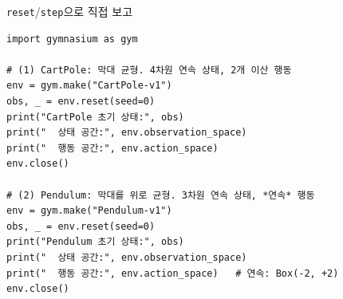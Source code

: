 \begin{frame}[fragile]{\texttt{reset}/\texttt{step}으로 직접 보고}
\begin{lstlisting}
import gymnasium as gym

# (1) CartPole: 막대 균형. 4차원 연속 상태, 2개 이산 행동
env = gym.make("CartPole-v1")
obs, _ = env.reset(seed=0)
print("CartPole 초기 상태:", obs)
print("  상태 공간:", env.observation_space)
print("  행동 공간:", env.action_space)
env.close()

# (2) Pendulum: 막대를 위로 균형. 3차원 연속 상태, *연속* 행동
env = gym.make("Pendulum-v1")
obs, _ = env.reset(seed=0)
print("Pendulum 초기 상태:", obs)
print("  상태 공간:", env.observation_space)
print("  행동 공간:", env.action_space)   # 연속: Box(-2, +2)
env.close()
\end{lstlisting}
  

\end{frame}
